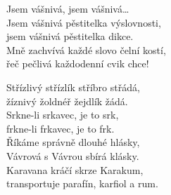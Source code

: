  

\nv Jsem vášnivá, jsem vášnivá\dots\\
Jsem vášnivá pěstitelka výslovnosti,\\
jsem vášnivá pěstitelka dikce.\\
Mně zachvívá každé slovo čelní kostí,\\
řeč pečlivá každodenní cvik chce!


\nv {}Střízlivý střízlík stříbro střádá,\\
žíznivý žoldnéř žejdlík žádá.\\
Srkne-li srkavec, je to srk,\\
frkne-li frkavec, je to frk.\\
Říkáme správně dlouhé hlásky,\\
Vávrová s Vávrou sbírá klásky.\\
Karavana kráčí skrze Karakum,\\
transportuje parafín, karfiol a rum.
\newpage
